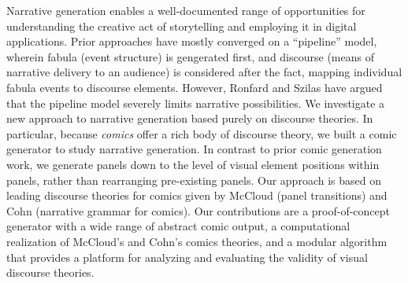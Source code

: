Narrative generation enables a well-documented range of opportunities for
understanding the creative act of storytelling and employing it in digital
applications.
Prior approaches have mostly converged on a ``pipeline'' model, wherein
fabula (event structure) is gengerated first, and discourse (means of
narrative delivery to an audience) is considered after the fact, mapping
individual fabula events to discourse elements. However, Ronfard and Szilas have
argued that the pipeline model severely limits
narrative possibilities. We investigate a new approach to
narrative generation based purely on discourse theories. In particular, 
because {\em comics} offer a rich body of discourse theory, we built a
comic generator to study narrative generation.  In contrast to prior comic
generation work, we generate panels down to the level of visual element
positions within panels, rather than rearranging pre-existing panels.  Our
approach is based on leading discourse theories for comics given by McCloud
(panel transitions) and Cohn (narrative grammar for comics).
Our contributions are a proof-of-concept generator with a wide range of
abstract comic output, a computational realization of McCloud's and Cohn's
comics theories, and a modular algorithm that provides a platform for
analyzing and evaluating the validity of visual discourse theories.


